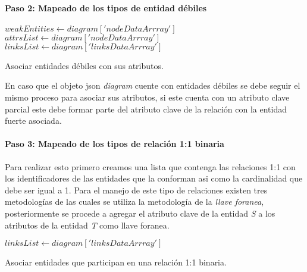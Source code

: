 \paragraph*{Paso 2: Mapeado de los tipos de entidad débiles}

\begin{algorithm}[H]

  $weakEntities \gets diagram['nodeDataArrray']$\\
  $attrsList \gets diagram['nodeDataArrray']$\\
  $linksList \gets diagram['linksDataArrray']$\\
   {
  }
  \caption{Asociar entidades débiles con sus atributos.}
\end{algorithm}

En caso que el objeto json \textit{diagram} cuente con entidades débiles se debe seguir el mismo proceso para asociar sus atributos, si este cuenta con un atributo clave parcial este debe formar parte del atributo clave de la relación con la entidad fuerte asociada.

\paragraph*{Paso 3: Mapeado de los tipos de relación 1:1 binaria}

Para realizar esto primero creamos una lista que contenga las relaciones 1:1 con los identificadores de las entidades que la conforman asi como la cardinalidad que debe ser igual a 1. Para el manejo de este tipo de relaciones existen tres metodologías de las cuales se utiliza la metodología de la \textit{llave foranea}, posteriormente se procede a agregar el atributo clave de la entidad \textit{S} a los atributos de la entidad \textit{T} como llave foranea. 

\begin{algorithm}[H]

  $linksList \gets diagram['linksDataArrray']$\\
  \caption{Asociar entidades que participan en una relación 1:1 binaria.}
\end{algorithm}

